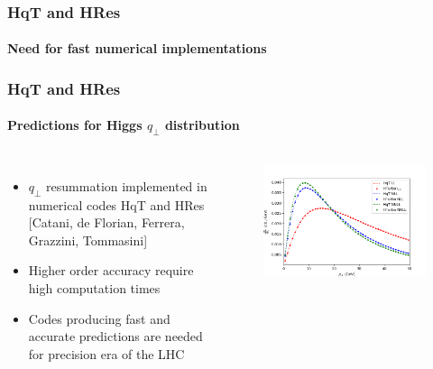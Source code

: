 \documentclass[aspectratio=43]{beamer}
\begin{document}
%
%

\begin{frame}


\end{frame}

\begin{frame}
	
	\frametitle{HqT and HRes}
	\framesubtitle{Need for fast numerical implementations}

\end{frame}

\begin{frame}

	\frametitle{HqT and HRes}
	\framesubtitle{Predictions for Higgs $q_{\perp}$ distribution}
	
	\begin{columns}
		
			
		\begin{itemize}
			\item $q_{\perp}$ resummation implemented in numerical codes HqT and HRes {\color{blue}[Catani, de Florian, Ferrera, Grazzini, Tommasini]} 
			\item Higher order accuracy require {\color{red}high computation times}
			\item Codes producing fast and accurate predictions are needed for precision era of the LHC
		\end{itemize}

	
		\begin{figure}
			\includegraphics[width = 7 cm]{plots/part3/chapter6/higgs_qt_all.png}
		\end{figure}		
			
	\end{columns}

\end{frame}
\end{document}
